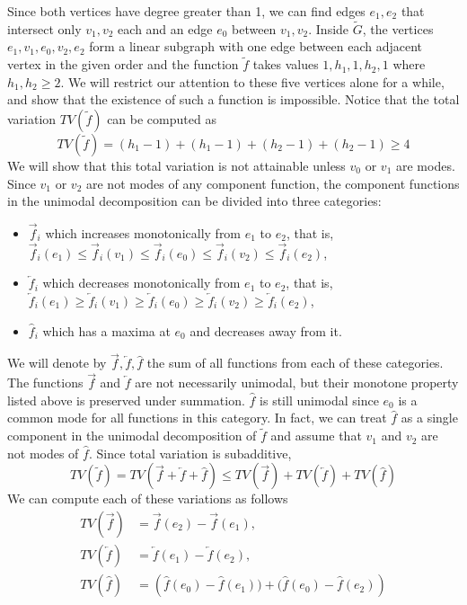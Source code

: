 \documentclass[11pt]{article}
\begin{document}
\iffalse 
 Since both vertices have degree greater than 1, we can find edges $e_1, e_2$ that intersect only $v_1, v_2$ each and an edge $e_0$ between $v_1,v_2$. Inside $\tilde{G}$, the vertices $e_1, v_1, e_0, v_2, e_2$ form a linear subgraph with one edge between each adjacent vertex in the given order and the function $\tilde{f}$ takes values $1,h_1,1,h_2,1$ where $h_1, h_2 \geq 2$. We will restrict our attention to these five vertices alone for a while, and show that the existence of such a function is impossible. Notice that the total variation $TV(\tilde{f})$ can be computed as 
 \[
 	TV(\tilde{f}) = (h_1 - 1) + (h_1 - 1) + (h_2 - 1) + (h_2 - 1) \geq 4
 \]
 We will show that this total variation is not attainable unless $v_0$ or $v_1$ are modes.
 Since $v_1$ or $v_2$ are not modes of any component function, the component functions in the unimodal decomposition can be divided into three categories:
 \begin{itemize}
 	\item $\overrightarrow{f}_i$ which increases monotonically from $e_1$ to $e_2$, that is, $\overrightarrow{f}_i(e_1) \leq \overrightarrow{f}_i(v_1) \leq \overrightarrow{f}_i(e_0) \leq \overrightarrow{f}_i(v_2) \leq \overrightarrow{f}_i(e_2)$,
	\item $\overleftarrow{f}_i$ which decreases monotonically from $e_1$ to $e_2$, that is, $\overleftarrow{f}_i(e_1) \geq \overleftarrow{f}_i(v_1) \geq \overleftarrow{f}_i(e_0) \geq \overleftarrow{f}_i(v_2) \geq \overleftarrow{f}_i(e_2)$,
	\item $\widehat{f}_i$ which has a maxima at $e_0$ and decreases away from it.
 \end{itemize}
 We will denote by $\overrightarrow{f}, \overleftarrow{f}, \widehat{f}$ the sum of all functions from each of these categories. The functions $\overrightarrow{f}$ and $\overleftarrow{f}$ are not necessarily unimodal, but their monotone property listed above is preserved under summation. $\widehat{f}$ is still unimodal since $e_0$ is a common mode for all functions in this category. In fact, we can treat $\widehat{f}$ as a single component in the unimodal decomposition of $\tilde{f}$ and assume that $v_1$ and $v_2$ are not modes of $\widehat{f}$. Since total variation is
 subadditive, 
 \[
 	TV(\tilde{f}) = TV(\overrightarrow{f} + \overleftarrow{f} + \widehat{f}) \leq TV(\overrightarrow{f}) + TV(\overleftarrow{f}) + TV(\widehat{f})
 \]
 We can compute each of these variations as follows
 \begin{align*}
 	TV(\overrightarrow{f}) &= \overrightarrow{f}(e_2) - \overrightarrow{f}(e_1), \\
	 TV(\overleftarrow{f}) &= \overleftarrow{f}(e_1) - \overleftarrow{f}(e_2), \\
	 TV(\widehat{f}) &= \left( \widehat{f}(e_0) - \widehat{f}(e_1)) +  (\widehat{f}(e_0) - \widehat{f}(e_2) \right)
 \end{align*}
\end{document}
